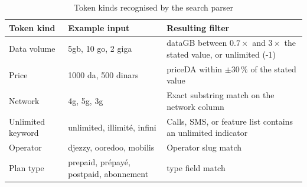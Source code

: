 \begin{table}[H]
  \caption{Token kinds recognised by the search parser}
  \label{tab:search-tokens}
  \centering\small
  \begin{tabular}{|p{2.5cm}|p{4.5cm}|p{6.4cm}|}
    \hline
    \textbf{Token kind} & \textbf{Example input} & \textbf{Resulting filter} \\
    \hline
    Data volume        & 5gb, 10 go, 2 giga                            & dataGB between $0.7\times$ and $3\times$ the stated value, or unlimited (-1) \\
    \hline
    Price              & 1000 da, 500 dinars                                    & priceDA within $\pm 30\,\%$ of the stated value \\
    \hline
    Network            & 4g, 5g, 3g                                    & Exact substring match on the network column \\
    \hline
    Unlimited keyword  & unlimited, illimité, infini                   & Calls, SMS, or feature list contains an unlimited indicator \\
    \hline
    Operator           & djezzy, ooredoo, mobilis                      & Operator slug match \\
    \hline
    Plan type          & prepaid, prépayé, postpaid, abonnement & type field match \\
    \hline
  \end{tabular}
\end{table}

